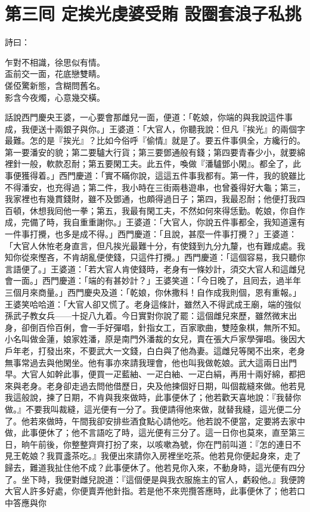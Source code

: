 
\chapter*{第三囘 定挨光虔婆受賄 設圈套浪子私挑}


詩曰：

\begin{myquote} 
乍對不相識，徐思似有情。\\盃前交一面，花底戀雙睛。\\傞俹驚新態，含糊問舊名。\\影含今夜燭，心意幾交橫。
\end{myquote} 

話說西門慶央王婆，一心要會那雌兒一面，便道：「乾娘，你端的與我說這件事成，我便送十兩銀子與你。」王婆道：「大官人，你聽我說：但凡『挨光』的兩個字最難。怎的是『挨光』？比如今俗呼『偷情』就是了。要五件事俱全，方纔行的。第一要潘安的貌；第二要驢大行貨；第三要鄧通般有錢；第四要青春少小，就要綿裡針一般，軟款忍耐；第五要閑工夫。此五件，喚做『潘驢鄧小閑』。都全了，此事便獲得着。」西門慶道：「實不瞞你說，這這五件事我都有。第一件，我的貌雖比不得潘安，也充得過；第二件，我小時在三街兩巷遊串，也曾養得好大龜；第三，我家裡也有幾貫錢財，雖不及鄧通，也頗得過日子；第四，我最忍耐；他便打我四百頓，休想我囘他一拳；第五，我最有閑工夫，不然如何來得恁勤。乾娘，你自作成，完備了時，我自重重謝你。」王婆道：「大官人，你說五件事都全，我知道還有一件事打攪，也多是成不得。」西門慶道：「且說，甚麼一件事打攪？」王婆道：「大官人休恠老身直言，但凡挨光最難十分，有使錢到九分九釐，也有難成處。我知你從來慳吝，不肯胡亂便使錢，只這件打攪。」西門慶道：「這個容易，我只聽你言語便了。」王婆道：「若大官人肯使錢時，老身有一條妙計，須交大官人和這雌兒會一面。」西門慶道：「端的有甚妙計？」王婆笑道：「今日晚了，且囘去，過半年三個月來商量。」西門慶央及道：「乾娘，你休撒科！自作成我則個，恩有重報。」王婆笑哈哈道：「大官人卻又慌了。老身這條計，雖然入不得武成王廟，端的強似孫武子教女兵——十捉八九着。今日實對你說了罷：這個雌兒來歷，雖然微末出身，卻倒百伶百俐，會一手好彈唱，針指女工，百家歌曲，雙陸象棋，無所不知。小名叫做金蓮，娘家姓潘，原是南門外潘裁的女兒，賣在張大戶家學彈唱。後因大戶年老，打發出來，不要武大一文錢，白白與了他為妻。這雌兒等閑不出來，老身無事常過去與他閑坐。他有事亦來請我理會，他也叫我做乾娘。武大這兩日出門早。大官人如幹此事，便買一疋藍紬、一疋白紬、一疋白絹，再用十兩好綿，都把來與老身。老身卻走過去問他借歷日，央及他揀個好日期，叫個裁縫來做。他若見我這般說，揀了日期，不肯與我來做時，此事便休了；他若歡天喜地說：『我替你做。』不要我叫裁縫，這光便有一分了。{}我便請得他來做，就替我縫，這光便二分了。他若來做時，午間我卻安排些酒食點心請他吃。他若說不便當，定要將去家中做，此事便休了；他不言語吃了時，這光便有三分了。這一日你也莫來，直至第三日，晌午前後，你整整齊齊打扮了來，以咳嗽為號，你在門前叫道：『怎的連日不見王乾娘？我買盞茶吃。』我便出來請你入房裡坐吃茶。他若見你便起身來，走了歸去，難道我扯住他不成？此事便休了。他若見你入來，不動身時，這光便有四分了。坐下時，我便對雌兒說道：『這個便是與我衣服施主的官人，虧殺他。』我便誇大官人許多好處，你便賣弄他針指。若是他不來兜攬答應時，此事便休了；他若口中答應與你